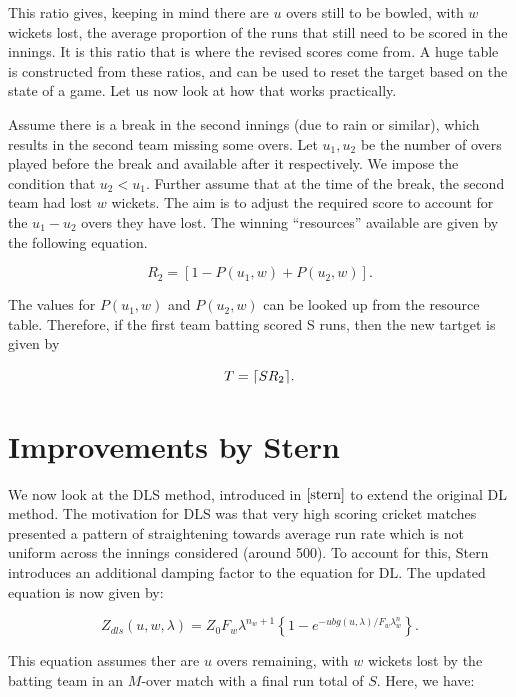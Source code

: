 This ratio gives, keeping in mind there are $u$ overs still to be bowled, with $w$ wickets
lost, the average proportion of the runs that still need to be scored in the innings. 
It is this ratio that is where the revised scores come from. A huge table is constructed from these 
ratios, and can be used to reset the target based on the state of a game. Let us now look at how that works
practically.

\begin{example}
    \label{dlExMain}
    Assume there is a break in the second innings (due to rain or similar), which results in the second team missing some overs.
    Let $u_1, u_2$ be the number of overs played before the break and available after it respectively. We impose the condition
    that $u_2 < u_1$. Further assume that at the time of the break, the second team had lost $w$ wickets. The aim is to adjust the required score to account
    for the $u_1 - u_2$ overs they have lost. The winning ``resources'' available are given by the following equation.

    \[
        R_2 = [1-P(u_1,w)+P(u_2,w)].
    \]  

    The values for $P(u_1,w)$ and $P(u_2,w)$ can be looked up from the resource table.
    Therefore, if the first team batting scored S runs, then the new tartget is given by

    \[
        T = \lceil SR_2\rceil.
    \]  
\end{example}

\section{Improvements by Stern}
We now look at the DLS method, introduced in $\cite{stern}$ to extend the original DL method. The motivation for DLS was that very high scoring
cricket matches presented a pattern of straightening towards average run rate which is not uniform across the innings considered (around 500). To account for 
this, Stern introduces an additional damping factor to the equation for DL. The updated equation is now given by:

\begin{equation}
    \label{dls}
    Z_{dls}(u,w,\lambda) = Z_0F_w\lambda^{n_w+1} \left\{ 1-e^{-ubg(u,\lambda)/F_w\lambda^n_w} \right\}.
\end{equation}

This equation assumes ther are $u$ overs remaining, with $w$ wickets lost by the batting team in an $M$-over match with a final run total of $S$. Here, we have:

